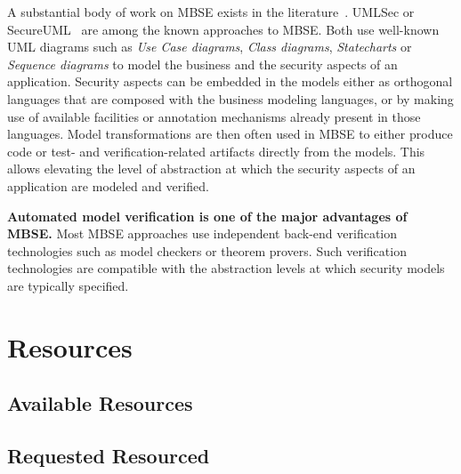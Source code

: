 A substantial body of work on MBSE exists in the literature~\cite{advancesmds}.
UMLSec or SecureUML~\cite{umlsec,secureuml} are among the known approaches
to MBSE. Both use well-known UML diagrams such as \emph{Use Case diagrams},
\emph{Class diagrams}, \emph{Statecharts} or \emph{Sequence diagrams} to model
the business and the security aspects of an application. Security aspects can be embedded in the models either as orthogonal
languages that are composed with the business modeling languages, or by making
use of available facilities or annotation mechanisms already present in those
languages. Model transformations are then often used in MBSE to either produce
code or test- and verification-related artifacts directly from the models. This
allows elevating the level of abstraction at which the security aspects of an
application are modeled and verified.

\textbf{Automated model verification is one of the major advantages of MBSE.}
Most MBSE approaches use independent back-end verification technologies such as
model checkers or theorem provers. Such verification technologies are compatible 
with the abstraction levels at which security models are typically specified.

\section{Resources}

\subsection{Available Resources}

\subsection{Requested Resourced}

